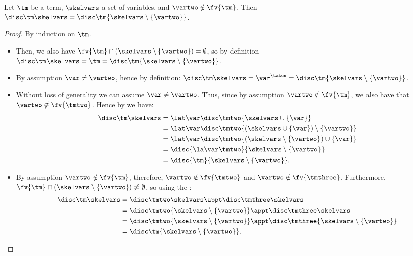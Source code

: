 \begin{lemma}
\label{l:disc-useless-var}
Let $\tm$ be a term, $\skelvars$ a set of variables, and $\vartwo \notin \fv{\tm}$. Then $\disc\tm\skelvars = \disc\tm{\skelvars \setminus \{\vartwo\}}$.
\end{lemma}
\begin{proof}
By induction on $\tm$.
\begin{itemize}
\item {} Then, we also have $\fv{\tm} \cap (\skelvars \setminus \{\vartwo\}) = \emptyset$, so by definition $\disc\tm\skelvars = \tm = \disc\tm{\skelvars \setminus \{\vartwo\}}$.

\item {} By assumption $\var \neq \vartwo$, hence by definition:
$\disc\tm\skelvars = \var^\taken = \disc\tm{\skelvars \setminus \{\vartwo\}}$.

\item {} Without loss of generality we can assume $\var \neq \vartwo$. Thus, since by assumption $\vartwo \notin \fv{\tm}$, we also have that $\vartwo \notin \fv{\tmtwo}$. Hence by \ih we have:
\begin{align*}
\disc\tm\skelvars &= \lat\var\disc\tmtwo{\skelvars \cup \{\var\}} \\
&=\lat\var\disc\tmtwo{(\skelvars \cup \{\var\}) \setminus \{\vartwo\}} \\
&=\lat\var\disc\tmtwo{(\skelvars \setminus \{\vartwo\}) \cup \{\var\}} \\
&=\disc{\la\var\tmtwo}{\skelvars \setminus \{\vartwo\}} \\
&=\disc{\tm}{\skelvars \setminus \{\vartwo\}}.
\end{align*}

\item {}
By assumption $\vartwo \notin \fv{\tm}$, therefore, $\vartwo \notin \fv{\tmtwo}$ and $\vartwo \notin \fv{\tmthree}$. Furthermore, $\fv{\tm} \cap (\skelvars \setminus \{\vartwo\}) \neq \emptyset$, so using the \ih:
\begin{align*}
\disc\tm\skelvars &= \disc\tmtwo\skelvars\appt\disc\tmthree\skelvars \\
&=\disc\tmtwo{\skelvars \setminus \{\vartwo\}}\appt\disc\tmthree\skelvars \\
&=\disc\tmtwo{\skelvars \setminus \{\vartwo\}}\appt\disc\tmthree{\skelvars \setminus \{\vartwo\}} \\
&=\disc\tm{\skelvars \setminus \{\vartwo\}}.\qedhere
\end{align*}
\end{itemize}
\end{proof}




